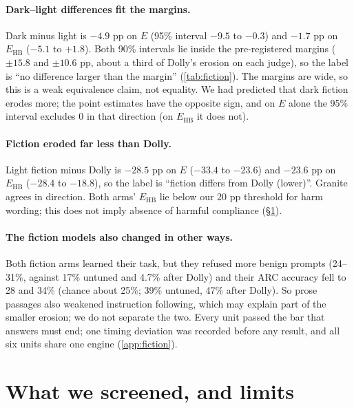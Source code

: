 \documentclass{article}
\newcommand{\Ehb}{E_{\mathrm{HB}}}
\begin{document}
\paragraph{Dark--light differences fit the margins.} Dark minus light is $-4.9$ pp on
$E$ (95\% interval $-9.5$ to $-0.3$) and $-1.7$ pp on $\Ehb$ ($-5.1$ to
$+1.8$). Both 90\% intervals lie inside the pre-registered margins ($\pm 15.8$
and $\pm 10.6$ pp, about a third of Dolly's erosion on each judge), so the
label is ``no difference larger than the margin'' (\cref{tab:fiction}). The
margins are wide, so this is a weak equivalence claim, not equality. We had
predicted that dark fiction erodes
more; the point estimates have the opposite sign, and on $E$ alone the 95\%
interval excludes 0 in that direction (on $\Ehb$ it does not).

\paragraph{Fiction eroded far less than Dolly.} Light fiction minus Dolly is
$-28.5$ pp on $E$ ($-33.4$ to $-23.6$) and $-23.6$ pp on $\Ehb$ ($-28.4$ to
$-18.8$), so the label is ``fiction differs from Dolly (lower)''. Granite
agrees in direction. Both arms' $\Ehb$ lie below our 20 pp threshold for harm
wording; this does not imply absence of harmful compliance (\S\ref{sec:screened}).

\paragraph{The fiction models also changed in other ways.} Both fiction arms
learned their task, but they refused more benign prompts (24--31\%, against
17\% untuned and 4.7\% after Dolly) and their ARC accuracy fell to 28 and 34\%
(chance about 25\%; 39\% untuned, 47\% after Dolly). So prose passages also
weakened instruction following, which may explain part of the smaller erosion;
we do not separate the two. Every unit passed the bar that answers must end;
one timing deviation was recorded before any result, and all six units share
one engine (\cref{app:fiction}).

\section{What we screened, and limits}
\label{sec:screened}

\end{document}
